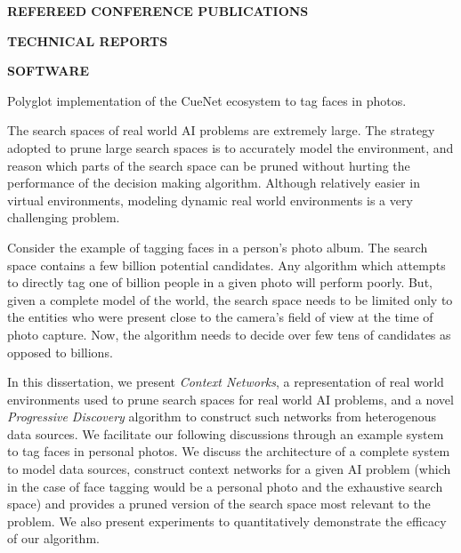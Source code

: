 {\pagebreak

\textbf{REFEREED CONFERENCE PUBLICATIONS}


\vspace{12pt}
\textbf{TECHNICAL REPORTS}


\vspace{12pt}
\textbf{SOFTWARE}

  {Polyglot implementation of the CueNet ecosystem to tag faces in photos.}

}

\thesisabstract
{
The search spaces of real world AI problems are extremely large. The strategy adopted to prune large search spaces is to accurately model the environment, and reason which parts of the search space can be pruned without hurting the performance of the decision making algorithm. Although relatively easier in virtual environments, modeling dynamic real world environments is a very challenging problem.

Consider the example of tagging faces in a person's photo album. The search space contains a few billion potential candidates. Any algorithm which attempts to directly tag one of billion people in a given photo will perform poorly. But, given a complete model of the world, the search space needs to be limited only to the entities who were present close to the camera's field of view at the time of photo capture. Now, the algorithm needs to decide over few tens of candidates as opposed to billions.

In this dissertation, we present \textit{Context Networks}, a representation of real world environments used to prune search spaces for real world AI problems, and a novel \textit{Progressive Discovery} algorithm to construct such networks from heterogenous data sources. We facilitate our following discussions through an example system to tag faces in personal photos. We discuss the architecture of a complete system to model data sources, construct context networks for a given AI problem (which in the case of face tagging would be a personal photo and the exhaustive search space) and provides a pruned version of the search space most relevant to the problem. We also present experiments to quantitatively demonstrate the efficacy of our algorithm.
}


